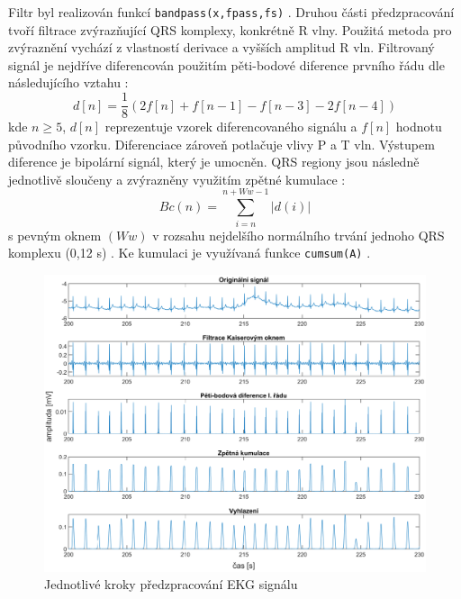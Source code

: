 Filtr byl realizován funkcí \texttt{bandpass(x,fpass,fs)} \cite{matlabBANDPASS}.
Druhou části předzpracování tvoří filtrace zvýrazňující QRS komplexy, konkrétně
R vlny. Použitá metoda pro zvýraznění vychází z vlastností derivace a vyšších
amplitud R vln. Filtrovaný signál je nejdříve diferencován použitím pěti-bodové
diference prvního řádu dle následujícího vztahu \cite{Wang2017}:
\begin{equation}
    \label{eq:differentiation}
    d[n] = \frac{1}{8}(2f[n] + f[n-1] - f[n-3] - 2f[n-4])
\end{equation}
kde $n \geq 5$, $d[n]$ reprezentuje vzorek diferencovaného signálu a $f[n]$
hodnotu původního vzorku. Diferenciace zároveň potlačuje vlivy P a T vln.
Výstupem diference je bipolární signál, který je umocněn. QRS regiony jsou
následně jednotlivě sloučeny a zvýrazněny využitím zpětné kumulace
\cite{Wang2017}:
\begin{equation}
    \label{eq:backward_cumulation}
    Bc(n) = \sum_{i=n}^{n+Ww-1} |d(i)|
\end{equation}
s pevným oknem $(Ww)$ v rozsahu nejdelšího normálního trvání jednoho QRS
komplexu (0,12 s) \cite{Wang2017}. Ke kumulaci je využívaná funkce
\texttt{cumsum(A)} \cite{matlabCUMSUM}.

\begin{figure}[h!]
    \begin{center}
        \includegraphics[width=1\textwidth]{../assets/figures/preprocessing_steps}
        \caption{Jednotlivé kroky předzpracování EKG signálu}
        \label{fig:preprocessing_steps}
    \end{center}
\end{figure}

